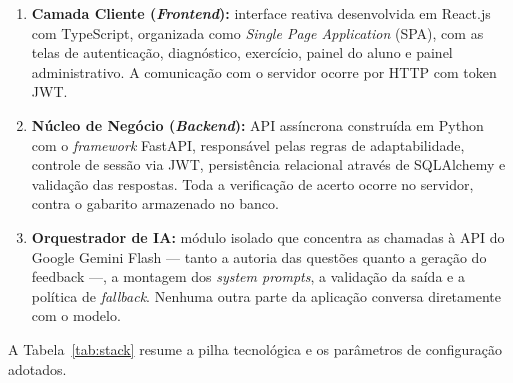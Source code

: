 \documentclass[10pt, a4paper, twocolumn]{article}
\begin{document}
\begin{enumerate}[leftmargin=0.4cm, itemsep=3pt]
    \item \textbf{Camada Cliente (\textit{Frontend}):} interface reativa
    desenvolvida em React.js com TypeScript, organizada como \textit{Single Page
    Application} (SPA), com as telas de autenticação, diagnóstico, exercício,
    painel do aluno e painel administrativo. A comunicação com o servidor ocorre
    por HTTP com token JWT.

    \item \textbf{Núcleo de Negócio (\textit{Backend}):} API assíncrona
    construída em Python com o \textit{framework} FastAPI, responsável pelas
    regras de adaptabilidade, controle de sessão via JWT, persistência
    relacional através de SQLAlchemy e validação das respostas. Toda a
    verificação de acerto ocorre no servidor, contra o gabarito armazenado no
    banco.

    \item \textbf{Orquestrador de IA:} módulo isolado que concentra as chamadas à
    API do Google Gemini Flash --- tanto a autoria das questões quanto a geração
    do feedback ---, a montagem dos \textit{system prompts}, a validação da saída
    e a política de \textit{fallback}. Nenhuma outra parte da aplicação conversa
    diretamente com o modelo.
\end{enumerate}

A Tabela~\ref{tab:stack} resume a pilha tecnológica e os parâmetros de
configuração adotados.
\end{document}
